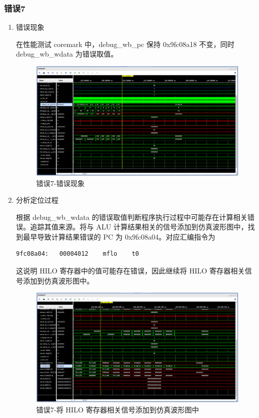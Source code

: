 \subsubsection{错误7}

\begin{enumerate}[(1)]
    \item 错误现象

在性能测试 coremark 中，debug\_wb\_pc 保持 0x9fc08a18 不变，同时 debug\_wb\_wdata 为错误取值。

\begin{figure}[H]
    \centering
    \includegraphics[width=\textwidth]{image/错误7-错误现象1.png}
    \caption{错误7-错误现象}
    \label{fig:错误7-错误现象1}
\end{figure}

    \item 分析定位过程

根据 debug\_wb\_wdata 的错误取值判断程序执行过程中可能存在计算相关错误。追踪其值来源。将与 ALU 计算结果相关的信号添加到仿真波形图中，找到最早导致计算结果错误的 PC 为 0x9fc08a04。对应汇编指令为

\begin{lstlisting}
9fc08a04:	00004012 	mflo	t0
\end{lstlisting}

这说明 HILO 寄存器中的值可能存在错误，因此继续将 HILO 寄存器相关信号添加到仿真波形图中。

\begin{figure}[H]
    \centering
    \includegraphics[width=\textwidth]{image/错误7-分析定位过程1.png}
    \caption{错误7-将 HILO 寄存器相关信号添加到仿真波形图中}
    \label{fig:错误7-分析定位过程1}
\end{figure}


\end{enumerate}
